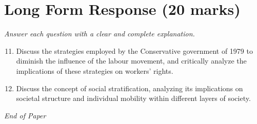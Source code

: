 \documentclass[12pt]{article}
\begin{document}
\section*{Long Form Response (20 marks)}
\textit{Answer each question with a clear and complete explanation.}
\begin{enumerate}[label=\arabic*.]
\setcounter{enumi}{10}
\item Discuss the strategies employed by the Conservative government of 1979 to diminish the influence of the labour movement, and critically analyze the implications of these strategies on workers' rights.
\item Discuss the concept of social stratification, analyzing its implications on societal structure and individual mobility within different layers of society.
\end{enumerate}

\vfill
\noindent\textit{End of Paper}
\end{document}
